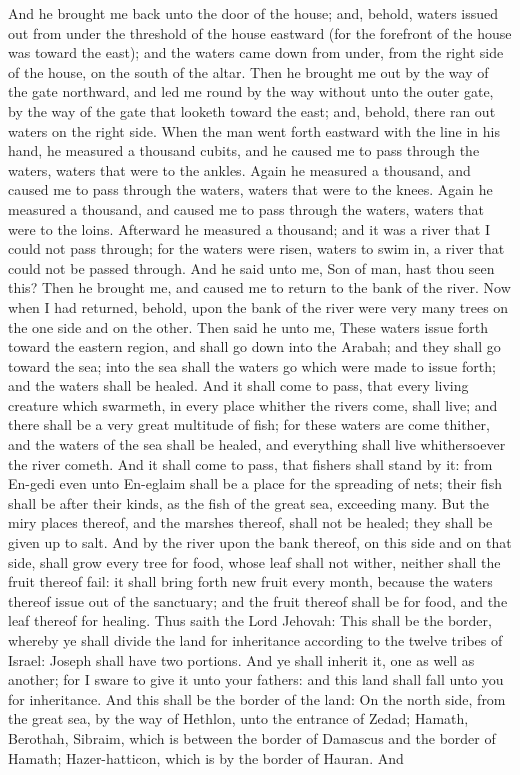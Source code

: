 And he brought me back unto the door of the house; and, behold, waters issued out from under the threshold of the house eastward (for the forefront of the house was toward the east); and the waters came down from under, from the right side of the house, on the south of the altar. Then he brought me out by the way of the gate northward, and led me round by the way without unto the outer gate, by the way of the gate that looketh toward the east; and, behold, there ran out waters on the right side.  When the man went forth eastward with the line in his hand, he measured a thousand cubits, and he caused me to pass through the waters, waters that were to the ankles. Again he measured a thousand, and caused me to pass through the waters, waters that were to the knees. Again he measured a thousand, and caused me to pass through the waters, waters that were to the loins. Afterward he measured a thousand; and it was a river that I could not pass through; for the waters were risen, waters to swim in, a river that could not be passed through.  And he said unto me, Son of man, hast thou seen this? Then he brought me, and caused me to return to the bank of the river. Now when I had returned, behold, upon the bank of the river were very many trees on the one side and on the other. Then said he unto me, These waters issue forth toward the eastern region, and shall go down into the Arabah; and they shall go toward the sea; into the sea shall the waters go which were made to issue forth; and the waters shall be healed. And it shall come to pass, that every living creature which swarmeth, in every place whither the rivers come, shall live; and there shall be a very great multitude of fish; for these waters are come thither, and the waters of the sea shall be healed, and everything shall live whithersoever the river cometh. And it shall come to pass, that fishers shall stand by it: from En-gedi even unto En-eglaim shall be a place for the spreading of nets; their fish shall be after their kinds, as the fish of the great sea, exceeding many. But the miry places thereof, and the marshes thereof, shall not be healed; they shall be given up to salt. And by the river upon the bank thereof, on this side and on that side, shall grow every tree for food, whose leaf shall not wither, neither shall the fruit thereof fail: it shall bring forth new fruit every month, because the waters thereof issue out of the sanctuary; and the fruit thereof shall be for food, and the leaf thereof for healing.  Thus saith the Lord Jehovah: This shall be the border, whereby ye shall divide the land for inheritance according to the twelve tribes of Israel: Joseph shall have two portions. And ye shall inherit it, one as well as another; for I sware to give it unto your fathers: and this land shall fall unto you for inheritance.  And this shall be the border of the land: On the north side, from the great sea, by the way of Hethlon, unto the entrance of Zedad; Hamath, Berothah, Sibraim, which is between the border of Damascus and the border of Hamath; Hazer-hatticon, which is by the border of Hauran. And 